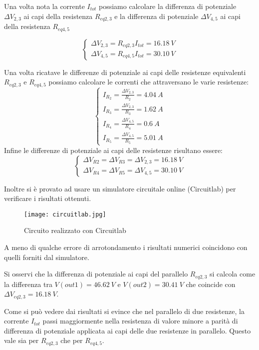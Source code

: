 \documentclass[a4paper,12pt]{article}
\begin{document}
\begin{enumerate}
Una volta nota la corrente $I_{tot}$ possiamo calcolare la differenza di potenziale $\Delta V_{2,3}$ ai capi della resistenza $R_{eq2,3}$ e la differenza di potenziale $\Delta V_{4,5}$ ai capi della resistenza $R_{eq4,5}$

\begin{equation}
\left\{
\begin{array}{l}
\Delta V_{2,3}=R_{eq2,3}I_{tot}=16.18\ V\\ \Delta V_{4,5}=R_{eq4,5}I_{tot}=30.10\ V
\end{array}
\right.
\end{equation}

Una volta ricatave le differenze di potenziale ai capi delle resistenze equivalenti $R_{eq2,3}$ e $R_{eq4,5}$ possiamo calcolare le correnti che attraversano le varie resistenze:
\begin{equation}
\left\{
\begin{array}{l}
I_{R_2}=\frac{\Delta V_{2,3}}{R_2}=4.04\ A\\ I_{R_3}=\frac{\Delta V_{2,3}}{R_3}=1.62\ A \\ I_{R_4}=\frac{\Delta V_{4,5}}{R_4}=0.6\ A \\ I_{R_5}=\frac{\Delta V_{4,5}}{R_5}=5.01\ A
\end{array}
\right.
\end{equation}
Infine le differenze di potenziale ai capi delle resistenze risultano essere:
\begin{equation}
\left\{
\begin{array}{l}
\Delta V_{R2}=\Delta V_{R3}= \Delta V_{2,3}=16.18\ V \\
\Delta V_{R4}=\Delta V_{R5}= \Delta V_{4,5}=30.10\ V
\end{array}
\right.
\end{equation}

Inoltre si è provato ad usare un simulatore circuitale online (Circuitlab) per verificare i risultati ottenuti.
\begin{figure}[H]
\centering
\texttt{[image: circuitlab.jpg]}
\caption {Circuito realizzato con Circuitlab}
\end{figure}

A meno di qualche errore di arrotondamento i risultati numerici coincidono con quelli forniti dal simulatore. 

Si osservi che la differenza di potenziale ai capi del parallelo $R_{eq2,3}$ si calcola come la differenza tra $V(out1)=46.62\ V$ e $V(out2)=30.41\ V$ che coincide con $\Delta V_{eq2,3}=16.18\ V$.

Come si può vedere dai risultati si evince che nel parallelo di due resistenze, la corrente $I_{tot}$ passi maggiormente nella resistenza di valore minore a parità di differenza di potenziale applicata ai capi delle due resistenze in parallelo. Questo vale sia per  $R_{eq2,3}$ che per $R_{eq4,5}$.
\end{enumerate}
\end{document}
